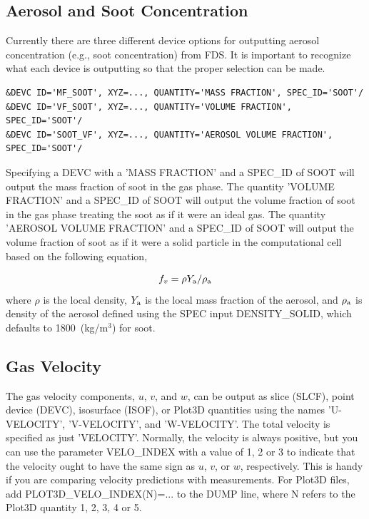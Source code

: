\documentclass[11pt]{book}
\begin{document}
\subsection{Aerosol and Soot Concentration}
\label{info:soot}

Currently there are three different device options for outputting aerosol concentration (e.g., soot concentration) from FDS. It is important to recognize what each device is outputting so that the proper selection can be made.

\begin{lstlisting}
&DEVC ID='MF_SOOT', XYZ=..., QUANTITY='MASS FRACTION', SPEC_ID='SOOT'/
&DEVC ID='VF_SOOT', XYZ=..., QUANTITY='VOLUME FRACTION', SPEC_ID='SOOT'/
&DEVC ID='SOOT_VF', XYZ=..., QUANTITY='AEROSOL VOLUME FRACTION', SPEC_ID='SOOT'/
\end{lstlisting}

\noindent Specifying a {\ct DEVC} with a {\ct 'MASS FRACTION'} and a {\ct SPEC\_ID} of {\ct SOOT} will output the mass fraction of soot in the gas phase. The quantity {\ct 'VOLUME FRACTION'} and a {\ct SPEC\_ID} of {\ct SOOT} will output the volume fraction of soot in the gas phase treating the soot as if it were an ideal gas. The quantity {\ct 'AEROSOL VOLUME FRACTION'} and a {\ct SPEC\_ID} of {\ct SOOT} will output the volume fraction of soot as if it were a solid particle in the computational cell based on the following equation,

\begin{equation}\label{eq:soot_volume_fraction}
f_v = \rho Y_{\rm a} / \rho_{\rm a}
\end{equation}
\noindent where $\rho$ is the local density, $Y_{\rm a}$ is the local mass fraction of the aerosol, and $\rho_{\rm a}$ is density of the aerosol defined using the {\ct SPEC} input {\ct DENSITY\_SOLID}, which defaults to 1800~(kg/m$^3$) for soot.

\subsection{Gas Velocity}
\label{info:velocity}

The gas velocity components, $u$, $v$, and $w$, can be output as slice ({\ct SLCF}), point device ({\ct DEVC}), isosurface ({\ct ISOF}), or Plot3D quantities using
the names {\ct 'U-VELOCITY'}, {\ct 'V-VELOCITY'}, and {\ct 'W-VELOCITY'}.
The total velocity is specified as just {\ct 'VELOCITY'}. Normally, the velocity is always positive, but you can use the parameter {\ct VELO\_INDEX} with a value
of 1, 2 or 3 to indicate that the velocity ought to have the same sign as $u$, $v$, or $w$, respectively. This is handy if you are comparing velocity predictions
with measurements. For Plot3D files, add {\ct PLOT3D\_VELO\_INDEX(N)=...} to the {\ct DUMP} line, where {\ct N} refers to the Plot3D quantity 1, 2, 3, 4 or 5.
\end{document}
